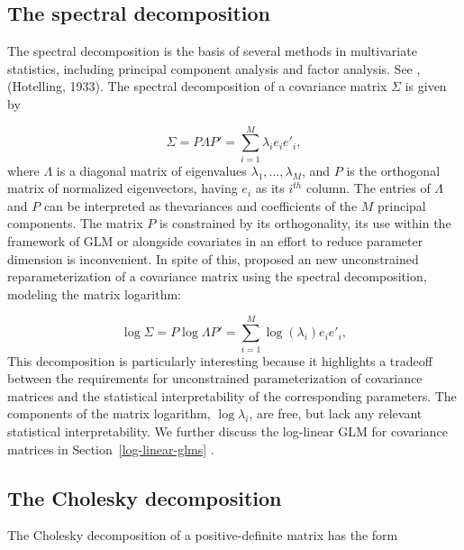 \subsection{The spectral decomposition}

The spectral decomposition is the basis of several methods in multivariate statistics, including principal component analysis and factor analysis. See \cite{Anderson84a},  (Hotelling, 1933). The spectral decomposition of a covariance matrix $\Sigma$ is given by

\begin{equation} \label{eq:spectral-decomposition}
\Sigma = P \Lambda P' = \sum_{i = 1}^M \lambda_i e_i e'_i,
\end{equation}
\noindent
where $\Lambda$ is a diagonal matrix of eigenvalues $\lambda_1,\dots, \lambda_M$, and $P$ is the orthogonal matrix of normalized eigenvectors, having  $e_i$ as its $i^{th}$ column. The entries of $\Lambda$ and $P$ can be interpreted as thevariances and coefficients of the $M$ principal components. The matrix $P$ is constrained by its orthogonality, its use within the framework of GLM or alongside covariates in an effort to reduce parameter dimension is inconvenient. In spite of this,  \cite{chiu1996matrix} proposed an new unconstrained reparameterization of a covariance matrix using the spectral decomposition, modeling the matrix logarithm:

\begin{equation} \label{eq:spectral-decomposition}
\log \Sigma = P \log\Lambda P' = \sum_{i = 1}^M \log\left(\lambda_i \right)e_i e'_i,
\end{equation}
\noindent
This decomposition is particularly interesting because it highlights a tradeoff between the requirements for unconstrained parameterization of covariance matrices and the statistical interpretability of the corresponding parameters. The components of the matrix logarithm, $\log \lambda_i$, are free, but lack any relevant statistical interpretability. We further discuss the log-linear GLM for covariance matrices in Section~\ref{log-linear-glms} .


\bigskip

\subsection{The Cholesky decomposition} \label{chapter-1-cholesky-decomposition}

The Cholesky decomposition of a positive-definite matrix has the form

